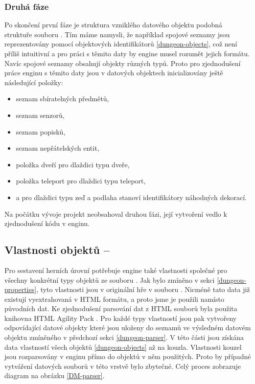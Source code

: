 \subsubsection{Druhá fáze}
Po skončení první fáze je struktura vzniklého datového objektu podobná struktuře souboru . Tím máme namysli, že
například spojové seznamy jsou reprezentovány pomocí objektových identifikátorů \vref{dungeon-objects}, což není příliš intuitivní a pro práci 
s těmito daty by engine musel rozumět jejich formátu. Navíc spojové seznamy obsahují objekty různých typů. Proto pro zjednodušení práce enginu
s těmito daty jsou v datových objektech inicializovány ještě následující položky: 
\begin{itemize} 
\item seznam sbíratelných předmětů,
\item seznam senzorů,
\item seznam popisků,
\item seznam nepřátelských entit,
\item položka dveří pro dlaždici typu dveře,
\item položka teleport pro dlaždici typu teleport,
\item a pro dlaždici typu zeď a podlaha stanoví identifikátory náhodných dekorací.
\end{itemize} 

Na počátku vývoje projekt neobsahoval druhou fázi, její vytvoření vedlo k zjednodušení kódu v enginu.

\subsection{Vlastnosti objektů -- }

Pro sestavení herních úrovní potřebuje engine také vlastnosti společné pro všechny konkrétní typy objektů ze
souboru . Jak bylo zmíněno v sekci \ref{dungeon-properties}, tyto vlastnosti jsou v originální hře v souboru .
Nicméně tato data již existují vyextrahovaná v HTML formátu, a proto jsme je použili namísto původních dat.
Ke zjednodušení parsování dat z HTML souborů byla
použita knihovna HTML Agility Pack \cite{HtmlAgilityPack}. Pro každé typy vlastností jsou pak vytvořeny odpovídající datové objekty
které jsou uloženy do seznamů ve výsledném datovém objektu zmíněného v předchozí
sekci \ref{dungeon-parser}. V této části jsou získána data vlastností všech objektů \vref{dungeon-objects} až na kouzla.
Vlastnosti kouzel jsou rozparsovány v enginu přímo do objektů v něm použitých. Proto by případné vytváření datových souborů
v této vrstvě bylo zbytečné. Celý proces zobrazuje diagram na obrázku \ref{DM-parser}.

